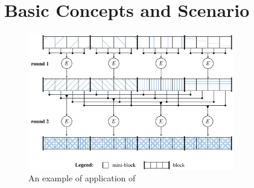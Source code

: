 \section{Basic Concepts and Scenario}
\label{dcs:sec:background}


\begin{figure}
	\begin{center}
		\includegraphics[width=0.8\textwidth]{figures/bdfprs-fig01}
	\end{center}
	\caption{\label{dcs:fig:mixing}An example of application of \name}
\end{figure}



